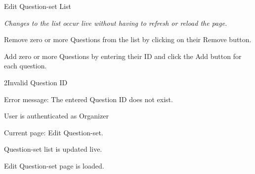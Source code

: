 
\begin{uc}{Edit Question-set List}

    \emph{Changes to the list occur live without having to refresh or reload the page.}


    \begin{uc-mss}
    \item Remove zero or more Questions from the list by clicking on their Remove button.
    \item Add zero or more Questions by entering their ID and click the Add button for
    each question.
    \end{uc-mss}

    \begin{uc-ext}

        \begin{uc-fail}{2}{Invalid Question ID}
        \item Error message: The entered Question ID does not exist.
        \end{uc-fail}

    \end{uc-ext}

    \begin{uc-pre}
    \item User is authenticated as Organizer
    \item Current page: Edit Question-set.
    \end{uc-pre}

    \begin{uc-post}
    \item Question-set list is updated live.
    \end{uc-post}

    \begin{uc-trig}
        Edit Question-set page is loaded.
    \end{uc-trig}

\end{uc}
